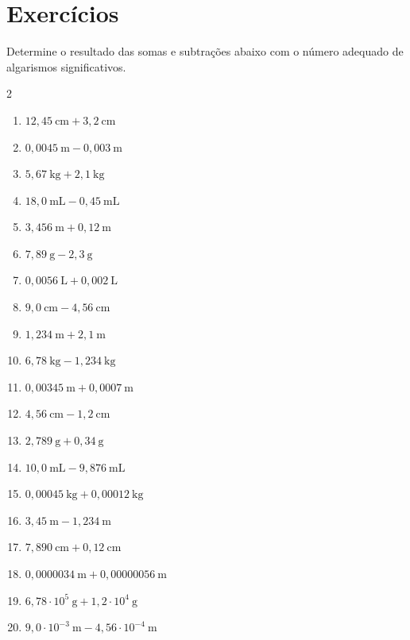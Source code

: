 \section{Exercícios}

\begin{question}[type={exam}]
Determine o resultado das somas e subtrações abaixo com o número adequado de algarismos significativos.
\begin{multicols}{2}
\begin{enumerate}
\item $12{,}45\ \text{cm} + 3{,}2\ \text{cm}$
\item $0{,}0045\ \text{m} - 0{,}003\ \text{m}$
\item $5{,}67\ \text{kg} + 2{,}1\ \text{kg}$
\item $18{,}0\ \text{mL} - 0{,}45\ \text{mL}$
\item $3{,}456\ \text{m} + 0{,}12\ \text{m}$
\item $7{,}89\ \text{g} - 2{,}3\ \text{g}$
\item $0{,}0056\ \text{L} + 0{,}002\ \text{L}$
\item $9{,}0\ \text{cm} - 4{,}56\ \text{cm}$
\item $1{,}234\ \text{m} + 2{,}1\ \text{m}$
\item $6{,}78\ \text{kg} - 1{,}234\ \text{kg}$
\item $0{,}00345\ \text{m} + 0{,}0007\ \text{m}$
\item $4{,}56\ \text{cm} - 1{,}2\ \text{cm}$
\item $2{,}789\ \text{g} + 0{,}34\ \text{g}$
\item $10{,}0\ \text{mL} - 9{,}876\ \text{mL}$
\item $0{,}00045\ \text{kg} + 0{,}00012\ \text{kg}$
\item $3{,}45\ \text{m} - 1{,}234\ \text{m}$
\item $7{,}890\ \text{cm} + 0{,}12\ \text{cm}$
\item $0{,}0000034\ \text{m} + 0{,}00000056\ \text{m}$
\item $6{,}78 \cdot 10^5\ \text{g} + 1{,}2 \cdot 10^4\ \text{g}$
\item $9{,}0 \cdot 10^{-3}\ \text{m} - 4{,}56 \cdot 10^{-4}\ \text{m}$
\end{enumerate}
\end{multicols}
\end{question}

